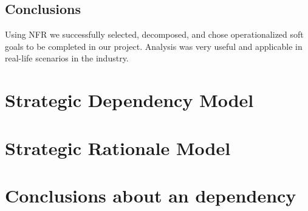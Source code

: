 \documentclass{VUMIFPSkursinis}
\begin{document}
\subsection{Conclusions}
 Using NFR we successfully selected, decomposed, and chose operationalized soft goals to be completed in our project.
Analysis was very useful and applicable in real-life scenarios in the industry.
\section{Strategic Dependency Model}
\section{Strategic Rationale Model}
\section{Conclusions about an dependency}
	
\end{document}
